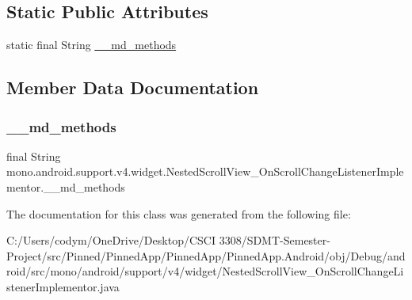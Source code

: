 \subsection*{Static Public Attributes}
\begin{DoxyCompactItemize}
\item 
static final String \hyperlink{classmono_1_1android_1_1support_1_1v4_1_1widget_1_1_nested_scroll_view___on_scroll_change_listener_implementor_aff89a2aa68d424dc98599788cbf43767}{\+\_\+\+\_\+md\+\_\+methods}
\end{DoxyCompactItemize}


\subsection{Member Data Documentation}
\mbox{\label{classmono_1_1android_1_1support_1_1v4_1_1widget_1_1_nested_scroll_view___on_scroll_change_listener_implementor_aff89a2aa68d424dc98599788cbf43767}} 
\subsubsection{\texorpdfstring{\+\_\+\+\_\+md\+\_\+methods}{\_\_md\_methods}}
{\footnotesize\ttfamily final String mono.\+android.\+support.\+v4.\+widget.\+Nested\+Scroll\+View\+\_\+\+On\+Scroll\+Change\+Listener\+Implementor.\+\_\+\+\_\+md\+\_\+methods\hspace{0.3cm}{\ttfamily [static]}}



The documentation for this class was generated from the following file\+:\begin{DoxyCompactItemize}
\item 
C\+:/\+Users/codym/\+One\+Drive/\+Desktop/\+C\+S\+C\+I 3308/\+S\+D\+M\+T-\/\+Semester-\/\+Project/src/\+Pinned/\+Pinned\+App/\+Pinned\+App/\+Pinned\+App.\+Android/obj/\+Debug/android/src/mono/android/support/v4/widget/Nested\+Scroll\+View\+\_\+\+On\+Scroll\+Change\+Listener\+Implementor.\+java\end{DoxyCompactItemize}
